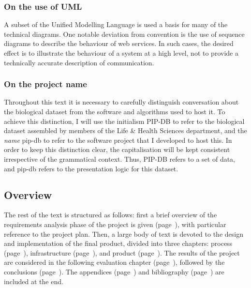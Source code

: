 \subsubsection*{On the use of UML}
A subset of the Unified Modelling Language \cite{ibm2003uml} is used a
basis for many of the technical diagrams. One notable deviation from
convention is the use of sequence diagrams \cite{ibm2004sequence} to
describe the behaviour of web services. In such cases, the desired
effect is to illustrate the behaviour of a system at a high level, not
to provide a technically accurate description of communication.


\subsubsection*{On the project name}
Throughout this text it is necessary to carefully distinguish
conversation about the biological dataset from the software and
algorithms used to host it. To achieve this distinction, I will use
the initialism PIP-DB to refer to the biological dataset assembled by
members of the Life \& Health Sciences department, and the
\textit{name} pip-db to refer to the software project that I developed
to host this. In order to keep this distinction clear, the
capitalisation will be kept consistent irrespective of the grammatical
context. Thus, PIP-DB refers to a set of data, and pip-db refers to
the presentation logic for this dataset.


\subsection*{Overview}\label{subsec:overview}
The rest of the text is structured as follows: first a brief overview
of the requirements analysis phase of the project is given
(page~\pageref{chap:requirements}), with particular reference to the
project plan. Then, a large body of text is devoted to the design and
implementation of the final product, divided into three chapters:
process (page~\pageref{chap:process}), infrastructure
(page~\pageref{chap:infrastructure}), and product
(page~\pageref{chap:product}). The results of the project are
considered in the following evaluation chapter
(page~\pageref{chap:evaluation}), followed by the conclusions
(page~\pageref{chap:conclusions}). The appendices
(page~\pageref{appendices}) and bibliography
(page~\pageref{bibliography}) are included at the end.

